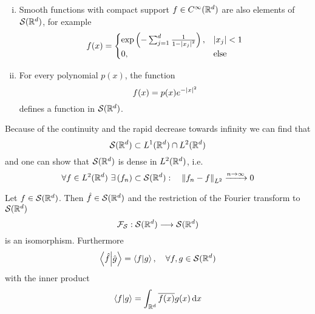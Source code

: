 \documentclass[../../script.tex]{subfiles}
\begin{document}
\begin{eg}
    \begin{enumerate}[(i)]
        \item Smooth functions with compact support $f \in C^{\infty}(\mathbb{R}^d)$ are also elements of $\mathcal{S}(\mathbb{R}^d)$, for example 
        \[
            f(x) = \begin{cases}
                \exp\left(-\sum_{j=1}^d \frac{1}{1 - \abs{x_j}^2}\right), & \abs{x_j} < 1 \\
                0, & \text{else}
            \end{cases}
        \]

        \item For every polynomial $p(x)$, the function 
        \[
            f(x) = p(x)e^{-\abs{x}^2}
        \]
        defines a function in $\mathcal{S}(\mathbb{R}^d)$.
    \end{enumerate}
\end{eg}

\begin{rem}
    Because of the continuity and the rapid decrease towards infinity we can find that 
    \[
        \mathcal{S}(\mathbb{R}^d) \subset L^1(\mathbb{R}^d) \cap L^2(\mathbb{R}^d)
    \]
    and one can show that $\mathcal{S}(\mathbb{R}^d)$ is dense in $L^2(\mathbb{R}^d)$, i.e.
    \[
        \forall f \in L^2(\realn^d) ~\exists \anyseqdef[f]{\mathcal{S}(\realn^d)}: \quad \norm{f_n - f}_{L^2} \conv{n \rightarrow \infty} 0
    \]
\end{rem}

\begin{thm}
    Let $f \in \mathcal{S}(\mathbb{R}^d)$. Then $\hat{f} \in \mathcal{S}(\mathbb{R}^d)$ and the restriction of the Fourier transform to $\mathcal{S}(\mathbb{R}^d)$
    \[
        \mathcal{F}_{\mathcal{S}}: \mathcal{S}(\mathbb{R}^d) \longrightarrow \mathcal{S}(\mathbb{R}^d)
    \]
    is an isomorphism. Furthermore 
    \[
        \innerproduct{\hat{f}}{\hat{g}} = \innerproduct{f}{g}, \quad \forall f, g \in \mathcal{S}(\realn^d)
    \]
    with the inner product 
    \[
        \innerproduct{f}{g} = \int_{\realn^d} \conj{f(x)}g(x) \dd{x}
    \]
\end{thm}
\end{document}
